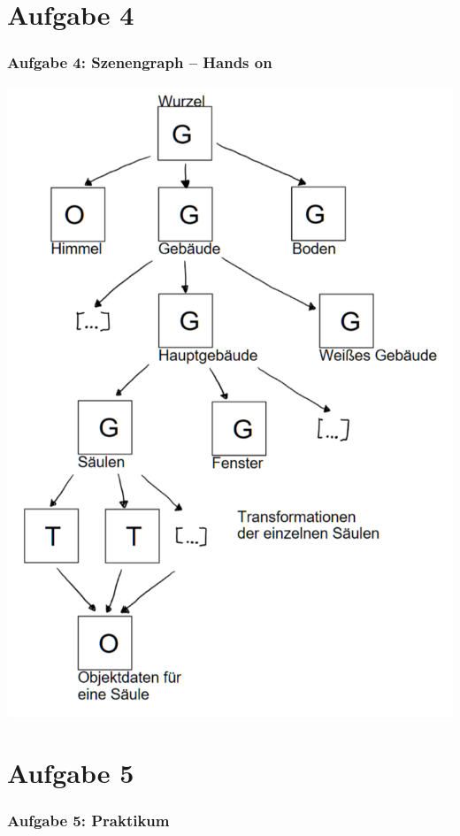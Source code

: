 \documentclass[accentcolor=tud9c,colorbacktitle,inverttitle,landscape,german,presentation,t]{tudbeamer}
\begin{document}
\section{Aufgabe 4}
\begin{frame}
	\frametitle{Aufgabe 4: Szenengraph – Hands on}
	\centering
	\includegraphics[height=1\textheight]{aufg4.png}
\end{frame}

\section{Aufgabe 5}
\begin{frame}
	\frametitle{Aufgabe 5: Praktikum}
\end{frame}
\end{document}
